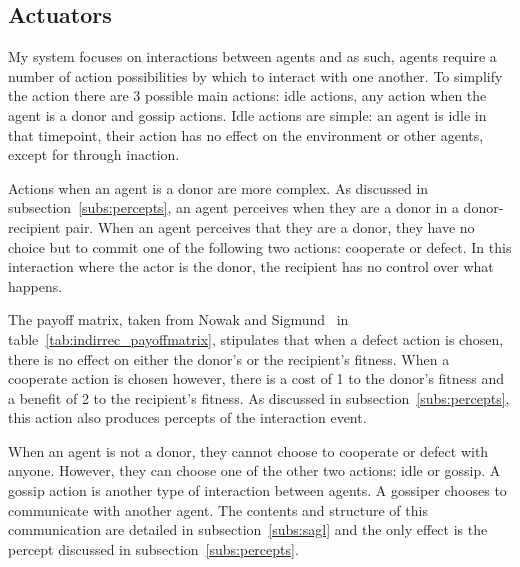 \documentclass[]{final_report}
\begin{document}
\subsection{Actuators}
\label{subs:actions}
My system focuses on interactions between agents and as such, agents require a number of action possibilities by which to interact with one another. To simplify the action there are 3 possible main actions: idle actions, any action when the agent is a donor and gossip actions. Idle actions are simple: an agent is idle in that timepoint, their action has no effect on the environment or other agents, except for through inaction.\par
Actions when an agent is a donor are more complex. As discussed in subsection~\ref{subs:percepts}, an agent perceives when they are a donor in a donor-recipient pair. When an agent perceives that they are a donor, they have no choice but to commit one of the following two actions: cooperate or defect. In this interaction where the actor is the donor, the recipient has no control over what happens.\par
The payoff matrix, taken from Nowak and Sigmund~\cite{evol_indirect_image} in table~\ref{tab:indirrec_payoffmatrix}, stipulates that when a defect action is chosen, there is no effect on either the donor's or the recipient's fitness. When a cooperate action is chosen however, there is a cost of 1 to the donor's fitness and a benefit of 2 to the recipient's fitness. As discussed in subsection~\ref{subs:percepts}, this action also produces percepts of the interaction event.\par 
When an agent is not a donor, they cannot choose to cooperate or defect with anyone. However, they can choose one of the other two actions: idle or gossip. A gossip action is another type of interaction between agents. A gossiper chooses to communicate with another agent. The contents and structure of this communication are detailed in subsection~\ref{subs:sagl} and the only effect is the percept discussed in subsection~\ref{subs:percepts}.
\end{document}
